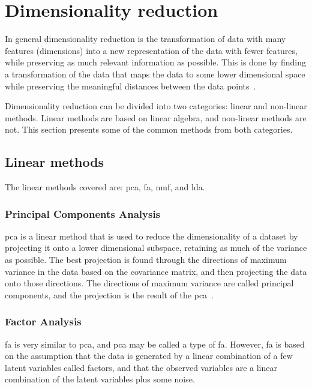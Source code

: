 \section{Dimensionality reduction}\label{sec:dimensionality-reduction}
In general dimensionality reduction is the transformation of data with many features (dimensions) into a new representation of the data with fewer features, while preserving as much relevant information as possible. This is done by finding a transformation of the data that maps the data to some lower dimensional space while preserving the meaningful distances between the data points~\cite{dimensionality-reduction-comparative-review}.

Dimensionality reduction can be divided into two categories: linear and non-linear methods. Linear methods are based on linear algebra, and non-linear methods are not. This section presents some of the common methods from both categories.


\subsection{Linear methods}\label{subsec:linear-methods}
The linear methods covered are: \gls{pca}, \gls{fa}, \gls{nmf}, and \gls{lda}.


\subsubsection{Principal Components Analysis}\label{subsubsec:principal-components-analysis}
\gls{pca} is a linear method that is used to reduce the dimensionality of a dataset by projecting it onto a lower dimensional subspace, retaining as much of the variance as possible. The best projection is found through the directions of maximum variance in the data based on the covariance matrix, and then projecting the data onto those directions. The directions of maximum variance are called principal components, and the projection is the result of the \gls{pca}~\cite{dimensionality-reduction-comparative-review}.


\subsubsection{Factor Analysis}\label{subsubsec:factor-analysis}
\gls{fa} is very similar to \gls{pca}, and \gls{pca} may be called a type of \gls{fa}. However, \gls{fa} is based on the assumption that the data is generated by a linear combination of a few latent variables called factors, and that the observed variables are a linear combination of the latent variables plus some noise.

